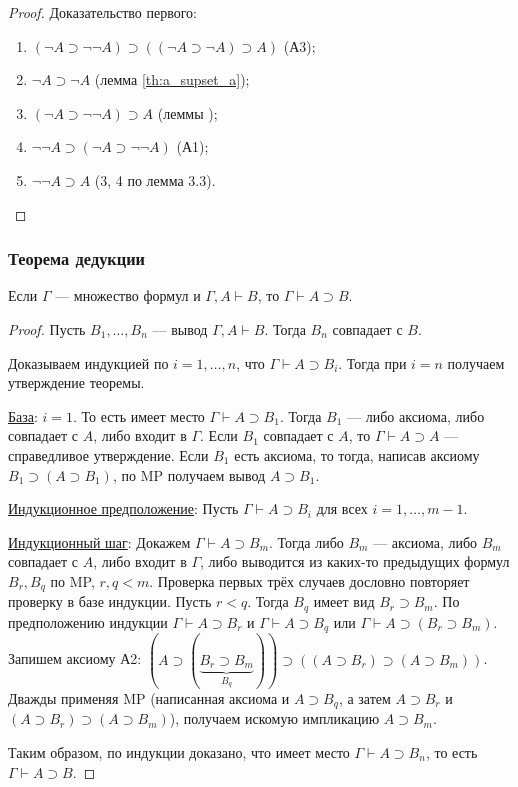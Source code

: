 \begin{proof}
    Доказательство первого:
    \begin{enumerate}
        \item $(\neg A \supset \neg\neg A) \supset ((\neg A \supset \neg A) \supset A)$ (А3);
        \item $\neg A \supset \neg A$ (лемма \ref{th:a_supset_a});
        \item $(\neg A \supset \neg\neg A) \supset A$ (леммы );
        \item $\neg\neg A \supset (\neg A \supset \neg\neg A)$ (А1);
        \item $\neg\neg A \supset A$ (3, 4 по лемма 3.3).
    \end{enumerate}
\end{proof}

\subsubsection{Теорема дедукции}
\begin{theorem}[дедукция в ИВ]
    Если $\Gamma$ --- множество формул и $\Gamma, A \vdash B$, то $\Gamma \vdash A \supset B$.
\end{theorem}
\begin{proof}
    Пусть $B_1, \dots, B_n$ --- вывод $\Gamma, A \vdash B$. Тогда $B_n$ совпадает с $B$. 

    Доказываем индукцией по $i = 1, \dots, n$, что $\Gamma \vdash A \supset B_i$. Тогда при $i = n$ получаем утверждение теоремы.

    \underline{База}: $i = 1$. То есть имеет место $\Gamma \vdash A \supset B_1$. Тогда $B_1$ --- либо аксиома, либо совпадает с $A$, либо входит в $\Gamma$. Если $B_1$ совпадает с $A$, то $\Gamma \vdash A \supset A$ --- справедливое утверждение. Если $B_1$ есть аксиома, то тогда, написав аксиому $B_1 \supset (A \supset B_1)$, по MP получаем вывод $A \supset B_1$.

    \underline{Индукционное предположение}: Пусть $\Gamma \vdash A \supset B_i$ для всех $i = 1, \dots, m - 1$.
    
    \underline{Индукционный шаг}: Докажем $\Gamma \vdash A \supset B_m$. Тогда либо $B_m$ --- аксиома, либо $B_m$ совпадает с $A$, либо входит в $\Gamma$, либо выводится из каких-то предыдущих формул $B_r, B_q$ по MP, $r, q < m$. Проверка первых трёх случаев дословно повторяет проверку в базе индукции. Пусть $r < q$. Тогда $B_q$ имеет вид $B_r \supset B_m$. По предположению индукции $\Gamma \vdash A \supset B_r$ и $\Gamma \vdash A \supset B_q$ или $\Gamma \vdash A \supset (B_r \supset B_m)$. Запишем аксиому А2: $(A \supset (\underbrace{B_r \supset B_m}_{B_q})) \supset ((A \supset B_r) \supset (A \supset B_m))$. Дважды применяя MP (написанная аксиома и $A \supset B_q$, а затем $A \supset B_r$ и $(A \supset B_r) \supset (A \supset B_m)$), получаем искомую импликацию $A \supset B_m$.

    Таким образом, по индукции доказано, что имеет место $\Gamma \vdash A \supset B_n$, то есть $\Gamma \vdash A \supset B$.
\end{proof}